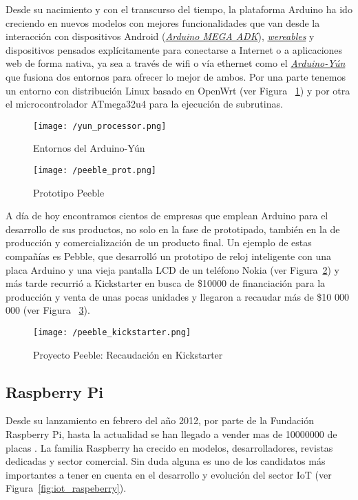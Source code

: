 Desde su nacimiento y con el transcurso del tiempo, la plataforma Arduino ha ido creciendo en nuevos modelos con mejores funcionalidades que van desde la interacción con dispositivos Android (\hyperref[tab:ADK]{\textit{Arduino MEGA ADK}}), \hyperref[tab:LilyPad]{\textit{wereables}} y dispositivos pensados explícitamente para conectarse a Internet o a aplicaciones web de forma nativa, ya sea a través de wifi o vía ethernet como el \hyperref[tab:arduino-yun]{\textit{Arduino-Yún}} que fusiona dos entornos para ofrecer  lo mejor  de  ambos. Por  una parte  tenemos  un entorno  con distribución  Linux  basado  en  OpenWrt (ver Figura ~\ref{fig:yun_processor}) y por otra el microcontrolador  ATmega32u4 para la ejecución de subrutinas.

\begin{figure}[!h]
\centering
\texttt{[image: /yun\_processor.png]}
\caption{Entornos del Arduino-Yún~\cite{Arduino-Yun}}
\label{fig:yun_processor}
\end{figure}

\begin{figure}[!h]
\centering
\texttt{[image: /peeble\_prot.png]}
\caption{Prototipo Peeble~\cite{Peeble}}
\label{fig:peeble_prot}
\end{figure}

A día de hoy encontramos cientos de empresas que emplean Arduino para el desarrollo de sus productos, no solo en la fase de prototipado, también en la de producción y comercialización de un producto final. Un ejemplo de estas compañías es Pebble, que desarrolló un prototipo de reloj inteligente con una placa Arduino y una vieja pantalla LCD de un teléfono Nokia (ver Figura~\ref{fig:peeble_prot}) y más tarde recurrió a Kickstarter en busca de \$10000 de financiación para la producción y venta de unas pocas unidades y llegaron a recaudar más de \$10 000 000 (ver Figura ~\ref{fig:peeble_kickstarter}).

\begin{figure}[hp]
\centering
\texttt{[image: /peeble\_kickstarter.png]}
\caption{Proyecto Peeble: Recaudación en Kickstarter~\cite{Peeble}}
\label{fig:peeble_kickstarter}
\end{figure}

\subsection{Raspberry Pi}

Desde su lanzamiento en febrero del año 2012, por parte de la Fundación Raspberry Pi, hasta la actualidad se han llegado a vender mas de 10000000 de placas \cite{NacionRS}. La familia Raspberry ha crecido en modelos, desarrolladores, revistas dedicadas y sector comercial. Sin duda alguna es uno de los candidatos más importantes a tener en cuenta en el desarrollo y evolución del sector \acf{IoT} (ver Figura~\ref{fig:iot_raspeberry}).

